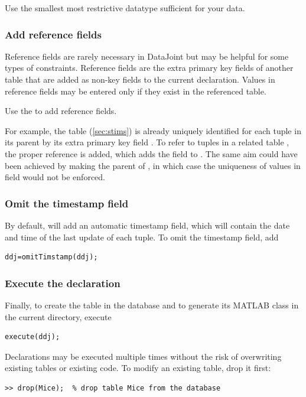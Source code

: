 \documentclass[10pt]{article}
\begin{document}
Use the smallest most restrictive datatype sufficient for your data.  


\subsubsection{Add reference fields}\label{sec:reference}
Reference fields are rarely necessary in DataJoint but may be helpful for some types of constraints. Reference fields are the extra primary key fields of another table that are added as non-key fields to the current declaration.  Values in reference fields may be entered only if they exist in the referenced table.

Use the  to add reference fields. 

For example, the table  (\autoref{sec:stims}) is already uniquely identified for each tuple in its parent  by its extra primary key field .  To refer to tuples in a related table , the proper reference is added, which adds the field  to .  The same aim could have been achieved by making  the parent of , in which case the uniqueness of values in field  would not be enforced.

\subsubsection{Omit the timestamp field}
By default,  will add an automatic timestamp field, which will contain the date and time of the last update of each tuple. To omit the timestamp field, add 
\begin{lstlisting}
ddj=omitTimstamp(ddj);
\end{lstlisting}

\subsubsection{Execute the declaration}
Finally, to create the table in the database and to generate its MATLAB class in the current directory, execute
\begin{lstlisting} 
execute(ddj);
\end{lstlisting}

Declarations may be executed multiple times without the risk of overwriting existing tables or existing code. To modify an existing table, drop it first:
\begin{lstlisting}
>> drop(Mice);  % drop table Mice from the database
\end{lstlisting}
\end{document}
